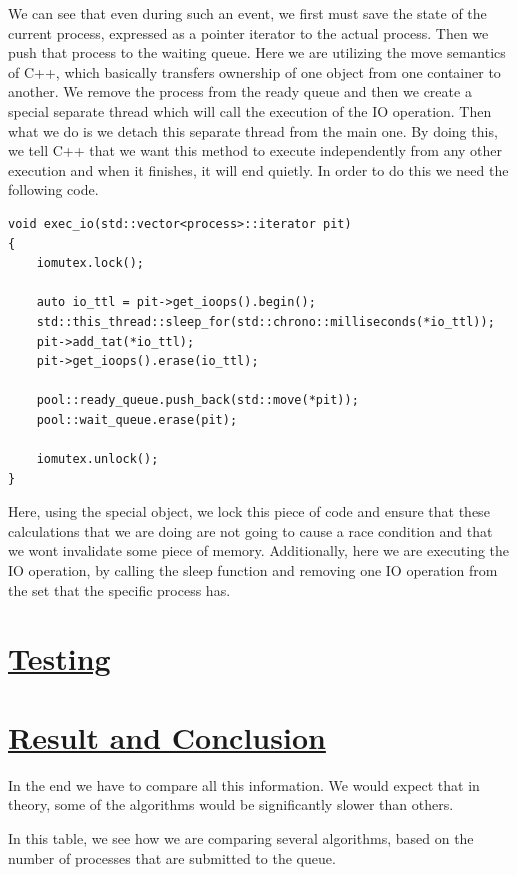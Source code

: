 \documentclass{article}
\newcommand{\code}[1]{\codeinline{\texttt{#1}}}
\begin{document}
We can see that even during such an event, we first must save the state of the current process, expressed as a pointer iterator to the actual process. Then we push that process to the waiting queue. Here we are utilizing the move semantics of C++, which basically transfers ownership of one object from one container to another. We remove the process from the ready queue and then we create a special separate thread which will call the execution of the IO operation. Then what we do is we detach this separate thread from the main one. By doing this, we tell C++ that we want this method to execute independently from any other execution and when it finishes, it will end quietly. In order to do this we need the following code.

\begin{lstlisting}
void exec_io(std::vector<process>::iterator pit)
{
    iomutex.lock();

    auto io_ttl = pit->get_ioops().begin();
    std::this_thread::sleep_for(std::chrono::milliseconds(*io_ttl));
    pit->add_tat(*io_ttl);
    pit->get_ioops().erase(io_ttl);

    pool::ready_queue.push_back(std::move(*pit));
    pool::wait_queue.erase(pit);

    iomutex.unlock();
}
\end{lstlisting}

Here, using the special \code{iomutex} object, we lock this piece of code and ensure that these calculations that we are doing are not going to cause a race condition and that we wont invalidate some piece of memory. Additionally, here we are executing the IO operation, by calling the sleep function and removing one IO operation from the set that the specific process has.

\section{\underline{Testing}}

\section{\underline{Result and Conclusion}}

In the end we have to compare all this information. We would expect that in theory, some of the algorithms would be significantly slower than others.

In this table, we see how we are comparing several algorithms, based on the number of processes that are submitted to the queue.
\end{document}
